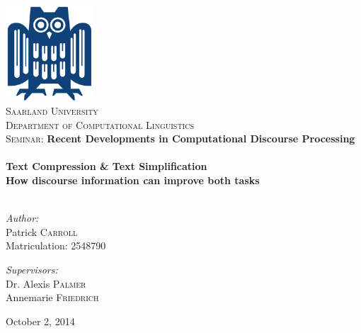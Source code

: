 \begin{titlepage}
\begin{center}

\includegraphics[width=0.25\textwidth]{./eule}~\\[1cm]

\textsc{\LARGE Saarland  University}\\[0.4cm]
\textsc{\Large Department of Computational Linguistics}\\[1.5cm]

\textsc{\Large Seminar:} \textbf{\Large Recent Developments in Computational Discourse Processing}\\[0.5cm]

\HRule \\[1.0cm]

{ \Large \bfseries Text Compression \& Text Simplification}\\[0.4cm]
{ \bfseries How discourse information can improve both tasks}\\[0.3cm]

\HRule \\[1.5cm]

\begin{minipage}{0.4\textwidth}
\begin{flushleft} \large
\emph{Author:}\\
Patrick \textsc{Carroll}\\
Matriculation: 2548790
\end{flushleft}
\end{minipage}
\begin{minipage}{0.4\textwidth}
\begin{flushright} \large
\emph{Supervisors:} \\
Dr. Alexis \textsc{Palmer}\\
Annemarie \textsc{Friedrich}\\
\end{flushright}
\end{minipage}

\vfill

{\large October 2, 2014}

\end{center}
\end{titlepage}
